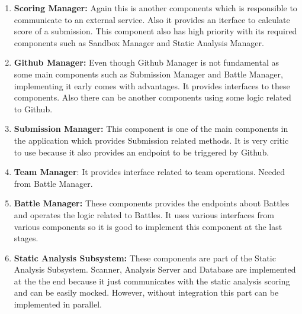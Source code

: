 \begin{enumerate}
    \item \textbf{Scoring Manager:} Again this is another components which is responsible to communicate to an external service. Also it provides an iterface to calculate score of a submission. This component also has high priority with its required components such as Sandbox Manager and Static Analysis Manager.
    \item \textbf{Github Manager:} Even though Github Manager is not fundamental as some main components such as Submission Manager and Battle Manager, implementing it early comes with advantages. It provides interfaces to these components. Also there can be another components using some logic related to Github. 
    \item \textbf{Submission Manager:} This component is one of the main components in the application which provides Submission related methods. It is very critic to use because it also provides an endpoint to be triggered by Github. 
    \item \textbf{Team Manager}: It provides interface related to team operations. Needed from Battle Manager.
    \item \textbf{Battle Manager:} These components provides the endpoints about Battles and operates the logic related to Battles. It uses various interfaces from various components so it is good to implement this component at the last stages.
    \item \textbf{Static Analysis Subsystem:} These components are part of the Static Analysis Subsystem. Scanner, Analysis Server and Database are implemented at the the end because it just communicates with the static analysis scoring and can be easily mocked. However, without integration this part can be implemented in parallel.
\end{enumerate}

\newpage
